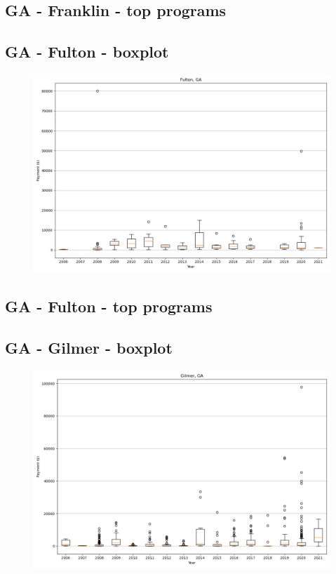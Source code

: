 \subsection*{GA - Franklin - top programs}

\newpage
\subsection*{GA - Fulton - boxplot}
\begin{figure}[h]
\centering
\includegraphics[width=7in]{../output/boxplots/counties/Fulton-GA_boxplot.png}
\end{figure}


\subsection*{GA - Fulton - top programs}

\newpage
\subsection*{GA - Gilmer - boxplot}
\begin{figure}[h]
\centering
\includegraphics[width=7in]{../output/boxplots/counties/Gilmer-GA_boxplot.png}
\end{figure}


